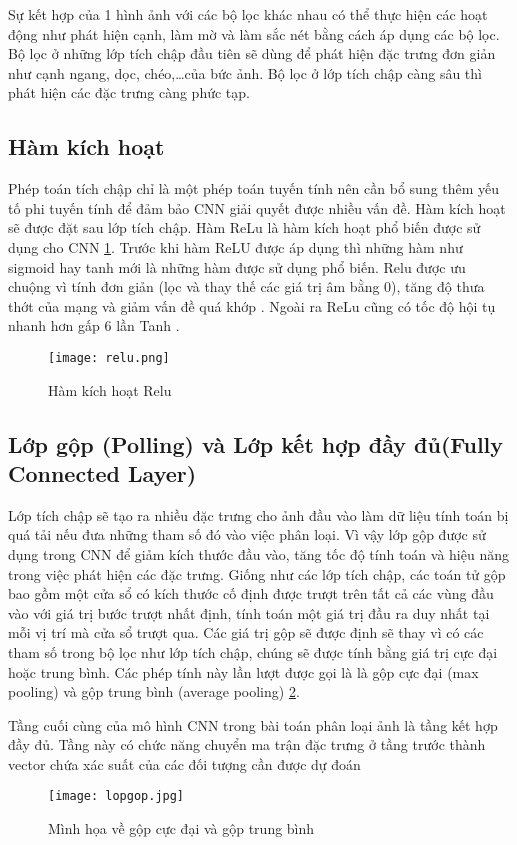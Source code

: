\documentclass[../the.tex]{subfiles}
\begin{document}
{\fontsize{13}{12} \selectfont
Sự kết hợp của 1 hình ảnh với các bộ lọc khác nhau có thể thực hiện các hoạt động như phát hiện cạnh, làm mờ và làm sắc nét bằng cách áp dụng các bộ lọc.
Bộ lọc ở những lớp tích chập đầu tiên sẽ dùng để phát hiện đặc trưng đơn giản như cạnh ngang, dọc, chéo,\dots của bức ảnh. Bộ lọc ở lớp tích chập càng sâu thì phát hiện các đặc trưng càng phức tạp. 
}


\subsection{Hàm kích hoạt}

{\fontsize{13}{12} \selectfont 	
Phép toán tích chập chỉ là một phép toán tuyến tính nên cần bổ sung thêm yếu tố phi tuyến tính để đảm bảo CNN giải quyết được nhiều vấn đề. 
Hàm kích hoạt sẽ được đặt sau lớp tích chập.
Hàm ReLu \cite{nair2010rectified} là hàm kích hoạt phổ biến được sử dụng cho CNN  \ref{fig:relu}. Trước khi hàm ReLU được áp dụng thì những hàm như sigmoid hay tanh mới là những hàm được sử dụng phổ biến.
Relu được ưu chuộng vì tính đơn giản (lọc và thay thế các giá trị âm bằng 0), tăng độ thưa thớt của mạng và giảm vấn đề quá khớp \cite{caruana2000overfitting}. 
Ngoài ra ReLu cũng có tốc độ hội tụ nhanh hơn gấp 6 lần Tanh \cite{krizhevsky2012imagenet}.
}
\begin{figure}[H]
	\centering
	\texttt{[image: relu.png]}
	\caption{Hàm kích hoạt Relu}
	\label{fig:relu}
\end{figure}

\subsection{Lớp gộp (Polling) và Lớp kết hợp đầy đủ(Fully Connected Layer)}

{\fontsize{13}{12} \selectfont
Lớp tích chập sẽ tạo ra nhiều đặc trưng cho ảnh đầu vào làm dữ liệu tính toán bị quá tải nếu đưa những tham số đó vào việc phân loại. 
Vì vậy lớp gộp được sử dụng trong CNN để giảm kích thước đầu vào, tăng tốc độ tính toán và hiệu năng trong việc phát hiện các đặc trưng.
Giống như các lớp tích chập, các toán tử gộp bao gồm một cửa sổ có kích thước cố định được trượt trên tất cả các vùng đầu vào với giá trị bước trượt nhất định, tính toán một giá trị đầu ra duy nhất tại mỗi vị trí mà cửa sổ trượt qua.
Các giá trị gộp sẽ được định sẽ thay vì có các tham số trong bộ lọc như lớp tích chập, chúng sẽ được tính bằng giá trị cực đại hoặc trung bình.
Các phép tính này lần lượt được gọi là là gộp cực đại (max pooling) và gộp trung bình (average pooling) \ref{fig:polling}.

Tầng cuối cùng của mô hình CNN trong bài toán phân loại ảnh là tầng kết hợp đầy đủ. Tầng này có chức năng chuyển ma trận đặc trưng ở tầng trước thành vector chứa xác suất của các đối tượng cần được dự đoán
}
\begin{figure}[H]
	\centering
	\texttt{[image: lopgop.jpg]}
	\caption{Mình họa về gộp cực đại và gộp trung bình}
	\label{fig:polling}
\end{figure}
\end{document}
